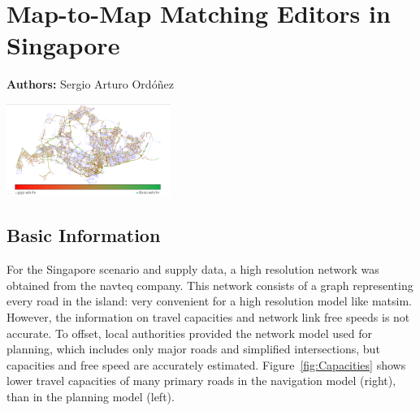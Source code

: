 \chapter{Map-to-Map Matching Editors in Singapore}
\label{ch:networkeditor-singapore}


\hfill \textbf{Authors:} Sergio Arturo Ordóñez

\begin{center}
\includegraphics[width=0.4\textwidth]{extending/figures/netEdSing/Result.png}
\end{center}


\section{Basic Information}
\label{sec:basic-information-map-matching-singapore}



For the Singapore scenario and supply data, a high resolution network was obtained from the \gls{navteq} company. This network consists of a graph representing every road in the island: very convenient for a high resolution model like \gls{matsim}. However, the information on travel capacities and network link free speeds is not accurate. To offset, local authorities provided the network model used for planning, which includes only major roads and simplified intersections, but capacities and free speed are accurately estimated. Figure~\ref{fig:Capacities} shows lower travel capacities of many primary roads in the navigation model (right), than in the planning model (left).

